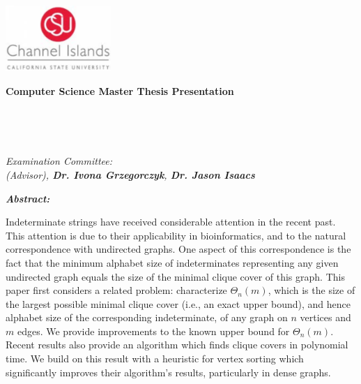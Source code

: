 \documentclass{article}
\begin{document}
\begin{center}

\includegraphics[width=0.3\textwidth]{media/ci-logo.png}\\

\hfill\break

\LARGE
\textbf{\color{grey}Computer Science Master Thesis Presentation}\\

\hfill\break
\hfill\break

\Large
{\bf \thesistitle}\\

\vspace{5mm}

\large
{\bf \studentname}\\

\vspace{5mm}

\large
\textit{ Examination Committee:\\
{\bf \advisorname} (Advisor), {\bf Dr. Ivona Grzegorczyk}, {\bf
Dr. Jason Isaacs}}\\

\hfill\break

\end{center}

\begin{adjustwidth}{1in}{1in}
\textit{\bf Abstract:}\\

\vspace{3mm}

\normalsize
\noindent Indeterminate strings have received considerable attention
in the recent past. This attention is due to their applicability in
bioinformatics, and to the natural correspondence with undirected
graphs.  One aspect of this correspondence is the fact that the
minimum alphabet size of indeterminates representing any given
undirected graph equals the size of the minimal clique cover of this
graph.  This paper first considers a related problem: characterize
$\Theta_n(m)$, which is the size of the largest possible minimal
clique cover (i.e., an exact upper bound), and hence alphabet size of
the corresponding indeterminate, of any graph on $n$ vertices and $m$
edges. We provide improvements to the known upper bound for
$\Theta_n(m)$.  Recent results also provide an algorithm
which finds clique covers in polynomial time. We build on this result
with a heuristic for vertex sorting which significantly improves their
algorithm's results, particularly in dense graphs.
\end{adjustwidth}
\end{document}
